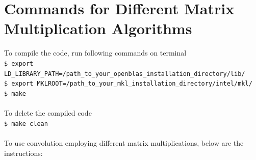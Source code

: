 \documentclass{article}
\begin{document}
\section*{Commands for Different Matrix Multiplication Algorithms}
To compile the code, run following commands on terminal\\
\texttt{\$ export LD\_LIBRARY\_PATH=/path\_to\_your\_openblas\_installation\_directory/lib/}\\
\texttt{\$ export MKLROOT=/path\_to\_your\_mkl\_installation\_directory/intel/mkl/}\\
\texttt{\$ make}\\
\\
To delete the compiled code\\
\texttt{\$ make clean}\\
\\
To use convolution employing different matrix multiplications, below are the instructions:
\end{document}
